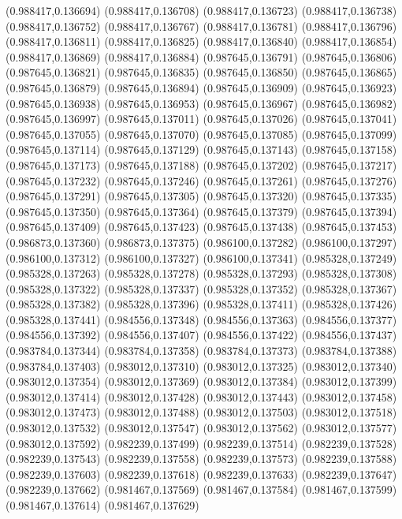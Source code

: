 (0.988417,0.136694)
(0.988417,0.136708)
(0.988417,0.136723)
(0.988417,0.136738)
(0.988417,0.136752)
(0.988417,0.136767)
(0.988417,0.136781)
(0.988417,0.136796)
(0.988417,0.136811)
(0.988417,0.136825)
(0.988417,0.136840)
(0.988417,0.136854)
(0.988417,0.136869)
(0.988417,0.136884)
(0.987645,0.136791)
(0.987645,0.136806)
(0.987645,0.136821)
(0.987645,0.136835)
(0.987645,0.136850)
(0.987645,0.136865)
(0.987645,0.136879)
(0.987645,0.136894)
(0.987645,0.136909)
(0.987645,0.136923)
(0.987645,0.136938)
(0.987645,0.136953)
(0.987645,0.136967)
(0.987645,0.136982)
(0.987645,0.136997)
(0.987645,0.137011)
(0.987645,0.137026)
(0.987645,0.137041)
(0.987645,0.137055)
(0.987645,0.137070)
(0.987645,0.137085)
(0.987645,0.137099)
(0.987645,0.137114)
(0.987645,0.137129)
(0.987645,0.137143)
(0.987645,0.137158)
(0.987645,0.137173)
(0.987645,0.137188)
(0.987645,0.137202)
(0.987645,0.137217)
(0.987645,0.137232)
(0.987645,0.137246)
(0.987645,0.137261)
(0.987645,0.137276)
(0.987645,0.137291)
(0.987645,0.137305)
(0.987645,0.137320)
(0.987645,0.137335)
(0.987645,0.137350)
(0.987645,0.137364)
(0.987645,0.137379)
(0.987645,0.137394)
(0.987645,0.137409)
(0.987645,0.137423)
(0.987645,0.137438)
(0.987645,0.137453)
(0.986873,0.137360)
(0.986873,0.137375)
(0.986100,0.137282)
(0.986100,0.137297)
(0.986100,0.137312)
(0.986100,0.137327)
(0.986100,0.137341)
(0.985328,0.137249)
(0.985328,0.137263)
(0.985328,0.137278)
(0.985328,0.137293)
(0.985328,0.137308)
(0.985328,0.137322)
(0.985328,0.137337)
(0.985328,0.137352)
(0.985328,0.137367)
(0.985328,0.137382)
(0.985328,0.137396)
(0.985328,0.137411)
(0.985328,0.137426)
(0.985328,0.137441)
(0.984556,0.137348)
(0.984556,0.137363)
(0.984556,0.137377)
(0.984556,0.137392)
(0.984556,0.137407)
(0.984556,0.137422)
(0.984556,0.137437)
(0.983784,0.137344)
(0.983784,0.137358)
(0.983784,0.137373)
(0.983784,0.137388)
(0.983784,0.137403)
(0.983012,0.137310)
(0.983012,0.137325)
(0.983012,0.137340)
(0.983012,0.137354)
(0.983012,0.137369)
(0.983012,0.137384)
(0.983012,0.137399)
(0.983012,0.137414)
(0.983012,0.137428)
(0.983012,0.137443)
(0.983012,0.137458)
(0.983012,0.137473)
(0.983012,0.137488)
(0.983012,0.137503)
(0.983012,0.137518)
(0.983012,0.137532)
(0.983012,0.137547)
(0.983012,0.137562)
(0.983012,0.137577)
(0.983012,0.137592)
(0.982239,0.137499)
(0.982239,0.137514)
(0.982239,0.137528)
(0.982239,0.137543)
(0.982239,0.137558)
(0.982239,0.137573)
(0.982239,0.137588)
(0.982239,0.137603)
(0.982239,0.137618)
(0.982239,0.137633)
(0.982239,0.137647)
(0.982239,0.137662)
(0.981467,0.137569)
(0.981467,0.137584)
(0.981467,0.137599)
(0.981467,0.137614)
(0.981467,0.137629)

